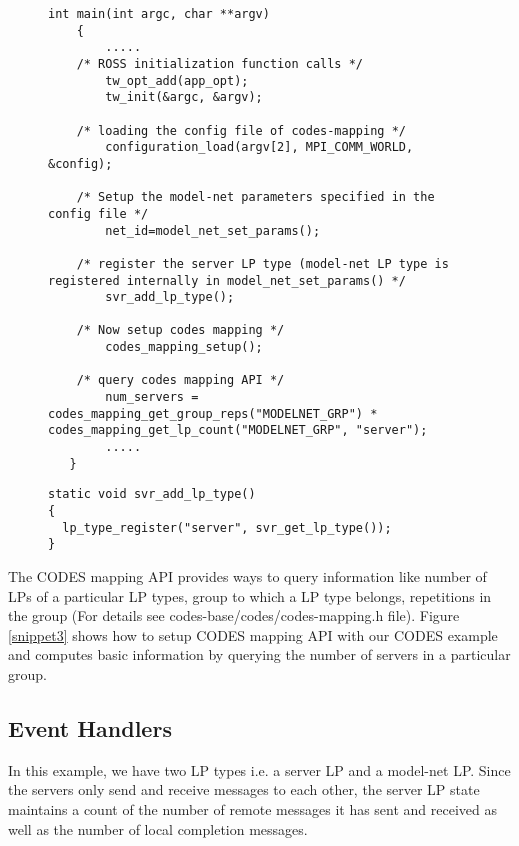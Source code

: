 \documentclass[conference,10pt,compsocconf,onecolumn]{IEEEtran}
\begin{document}
\begin{figure}
\begin{lstlisting}[caption=CODES mapping function calls in example program, label=snippet3]
    int main(int argc, char **argv)
    {
    	.....
	/* ROSS initialization function calls */
    	tw_opt_add(app_opt);
    	tw_init(&argc, &argv);

	/* loading the config file of codes-mapping */
    	configuration_load(argv[2], MPI_COMM_WORLD, &config);

	/* Setup the model-net parameters specified in the config file */
    	net_id=model_net_set_params();
	
	/* register the server LP type (model-net LP type is registered internally in model_net_set_params() */
    	svr_add_lp_type();

	/* Now setup codes mapping */
    	codes_mapping_setup();

	/* query codes mapping API */
    	num_servers = codes_mapping_get_group_reps("MODELNET_GRP") * codes_mapping_get_lp_count("MODELNET_GRP", "server");
    	..... 
   }
\end{lstlisting}
\end{figure}

\begin{figure}
\begin{lstlisting}[caption=Registering an LP type, label=snippet4]
static void svr_add_lp_type()
{
  lp_type_register("server", svr_get_lp_type());
}
\end{lstlisting}
\end{figure}

The CODES mapping API provides ways to query information like number of LPs of
a particular LP types, group to which a LP type belongs, repetitions in the
group (For details see codes-base/codes/codes-mapping.h file).  Figure
\ref{snippet3} shows how to setup CODES mapping API with our CODES example and
computes basic information by querying the number of servers in a particular
group. 

\subsection{Event Handlers}
In this example, we have two LP types i.e. a server LP and a model-net LP.
Since the servers only send and receive messages to each other, the server LP state
maintains a count of the number of remote messages it has sent and received as
well as the number of local completion messages.   
\end{document}
